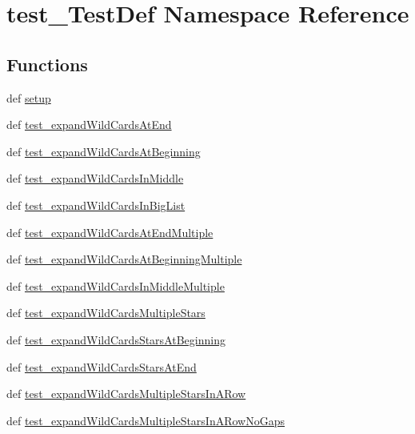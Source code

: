 \hypertarget{namespacetest___test_def}{\section{test\-\_\-\-Test\-Def Namespace Reference}
\label{namespacetest___test_def}
}
\subsection*{Functions}
\begin{DoxyCompactItemize}
\item 
def \hyperlink{namespacetest___test_def_a5d6f39e8ce85a48a0ef17deef16256cf}{setup}
\item 
def \hyperlink{namespacetest___test_def_a1c975c41c4ea84398ab1f3c407086a2e}{test\-\_\-expand\-Wild\-Cards\-At\-End}
\item 
def \hyperlink{namespacetest___test_def_ab07802efce3b4a7de2a14067c19e9360}{test\-\_\-expand\-Wild\-Cards\-At\-Beginning}
\item 
def \hyperlink{namespacetest___test_def_a29ea2fb75922b7620bbe9bd2af164739}{test\-\_\-expand\-Wild\-Cards\-In\-Middle}
\item 
def \hyperlink{namespacetest___test_def_a862e74186ada6ed014481a252a43e8d0}{test\-\_\-expand\-Wild\-Cards\-In\-Big\-List}
\item 
def \hyperlink{namespacetest___test_def_a7d4536413e9ff1d2c8e2ccce9408c1e0}{test\-\_\-expand\-Wild\-Cards\-At\-End\-Multiple}
\item 
def \hyperlink{namespacetest___test_def_a7593fcb059257412f75feb9ee7e9112b}{test\-\_\-expand\-Wild\-Cards\-At\-Beginning\-Multiple}
\item 
def \hyperlink{namespacetest___test_def_ad4def05d16a3b403fdeafd125d7e91e7}{test\-\_\-expand\-Wild\-Cards\-In\-Middle\-Multiple}
\item 
def \hyperlink{namespacetest___test_def_a912242120ad4887ab854ce51620040a9}{test\-\_\-expand\-Wild\-Cards\-Multiple\-Stars}
\item 
def \hyperlink{namespacetest___test_def_a7ddfa88efe8536ca1c1cff0e51567593}{test\-\_\-expand\-Wild\-Cards\-Stars\-At\-Beginning}
\item 
def \hyperlink{namespacetest___test_def_a4b3d40e5bede74b30308a467da9d2018}{test\-\_\-expand\-Wild\-Cards\-Stars\-At\-End}
\item 
def \hyperlink{namespacetest___test_def_aec3b4133f1e46fa5b3042e3d1419cde3}{test\-\_\-expand\-Wild\-Cards\-Multiple\-Stars\-In\-A\-Row}
\item 
def \hyperlink{namespacetest___test_def_a8fc79791143e851ce5a852c5f443dc67}{test\-\_\-expand\-Wild\-Cards\-Multiple\-Stars\-In\-A\-Row\-No\-Gaps}
\end{DoxyCompactItemize}


